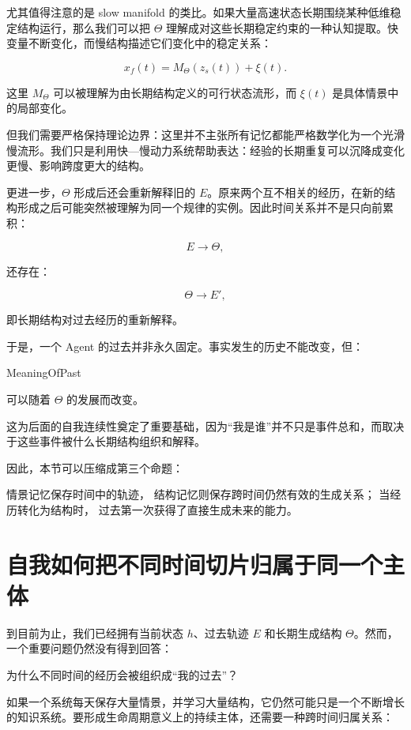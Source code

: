 尤其值得注意的是 slow manifold 的类比。如果大量高速状态长期围绕某种低维稳定结构运行，那么我们可以把 $\Theta$ 理解成对这些长期稳定约束的一种认知提取。快变量不断变化，而慢结构描述它们变化中的稳定关系：

\[
x_f(t)
=
M_{\Theta}(z_s(t))
+
\xi(t).
\]

这里 $M_{\Theta}$ 可以被理解为由长期结构定义的可行状态流形，而 $\xi(t)$ 是具体情景中的局部变化。

但我们需要严格保持理论边界：这里并不主张所有记忆都能严格数学化为一个光滑慢流形。我们只是利用快—慢动力系统帮助表达：经验的长期重复可以沉降成变化更慢、影响跨度更大的结构。

更进一步，$\Theta$ 形成后还会重新解释旧的 $E$。原来两个互不相关的经历，在新的结构形成之后可能突然被理解为同一个规律的实例。因此时间关系并不是只向前累积：

\[
E
\rightarrow
\Theta,
\]

还存在：

\[
\Theta
\rightarrow
E',
\]

即长期结构对过去经历的重新解释。

于是，一个 Agent 的过去并非永久固定。事实发生的历史不能改变，但：

\begin{statementbox}
MeaningOfPast
\end{statementbox}

可以随着 $\Theta$ 的发展而改变。

这为后面的自我连续性奠定了重要基础，因为“我是谁”并不只是事件总和，而取决于这些事件被什么长期结构组织和解释。

因此，本节可以压缩成第三个命题：

\begin{proposition*}
情景记忆保存时间中的轨迹，
结构记忆则保存跨时间仍然有效的生成关系；
当经历转化为结构时，
过去第一次获得了直接生成未来的能力。
\end{proposition*}

\section{自我如何把不同时间切片归属于同一个主体}

到目前为止，我们已经拥有当前状态 $h$、过去轨迹 $E$ 和长期生成结构 $\Theta$。然而，一个重要问题仍然没有得到回答：

为什么不同时间的经历会被组织成“我的过去”？

如果一个系统每天保存大量情景，并学习大量结构，它仍然可能只是一个不断增长的知识系统。要形成生命周期意义上的持续主体，还需要一种跨时间归属关系：

